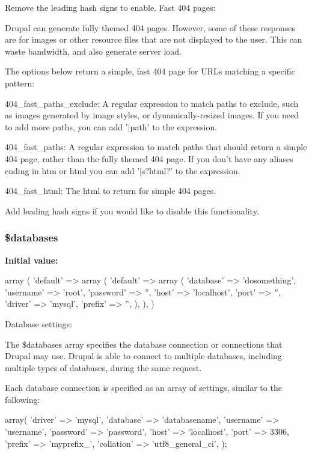 Remove the leading hash signs to enable. Fast 404 pages:

Drupal can generate fully themed 404 pages. However, some of these responses are for images or other resource files that are not displayed to the user. This can waste bandwidth, and also generate server load.

The options below return a simple, fast 404 page for URLs matching a specific pattern:
\begin{DoxyItemize}
\item 404\_\-fast\_\-paths\_\-exclude: A regular expression to match paths to exclude, such as images generated by image styles, or dynamically-\/resized images. If you need to add more paths, you can add '$|$path' to the expression.
\item 404\_\-fast\_\-paths: A regular expression to match paths that should return a simple 404 page, rather than the fully themed 404 page. If you don't have any aliases ending in htm or html you can add '$|$s?html?' to the expression.
\item 404\_\-fast\_\-html: The html to return for simple 404 pages.
\end{DoxyItemize}

Add leading hash signs if you would like to disable this functionality. \hypertarget{settings_8php_a97cde67402a68697692531e8b067f86f}{
\subsubsection[{\$databases}]{\setlength{\rightskip}{0pt plus 5cm}\$databases}}
\label{settings_8php_a97cde67402a68697692531e8b067f86f}
{\bfseries Initial value:}
\begin{DoxyCode}
 array (
  'default' => 
  array (
    'default' => 
    array (
      'database' => 'dosomething',
      'username' => 'root',
      'password' => '',
      'host' => 'localhost',
      'port' => '',
      'driver' => 'mysql',
      'prefix' => '',
    ),
  ),
)
\end{DoxyCode}
Database settings:

The \$databases array specifies the database connection or connections that Drupal may use. Drupal is able to connect to multiple databases, including multiple types of databases, during the same request.

Each database connection is specified as an array of settings, similar to the following: 
\begin{DoxyCode}
 array(
   'driver' => 'mysql',
   'database' => 'databasename',
   'username' => 'username',
   'password' => 'password',
   'host' => 'localhost',
   'port' => 3306,
   'prefix' => 'myprefix_',
   'collation' => 'utf8_general_ci',
 );
\end{DoxyCode}


